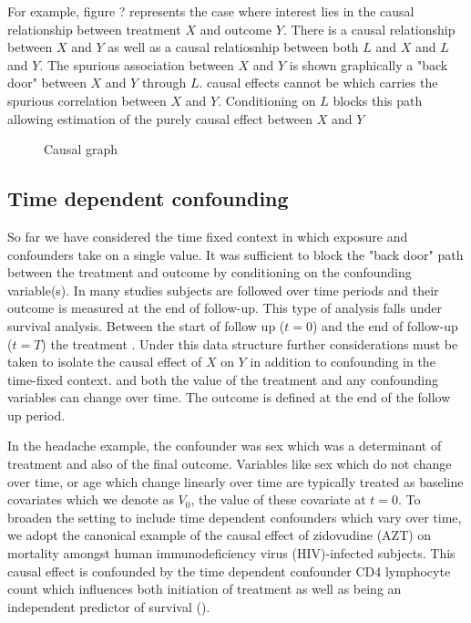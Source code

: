 \documentclass[11pt]{article}
\begin{document}
For example, figure ? represents the case where interest lies in the
causal relationship between treatment \(X\) and outcome \(Y\). There is
a causal relationship between \(X\) and \(Y\) as well as a causal
relatiosnhip between both \(L\) and \(X\) and \(L\) and \(Y\). The
spurious association between \(X\) and \(Y\) is shown graphically a
"back door" between \(X\) and \(Y\) through \(L\). causal effects cannot
be which carries the spurious correlation between \(X\) and \(Y\).
Conditioning on \(L\) blocks this path allowing estimation of the purely
causal effect between \(X\) and \(Y\)

    \begin{figure}
\caption{Causal graph}
\end{figure}

    \subsection{Time dependent
confounding}\label{time-dependent-confounding}

So far we have considered the time fixed context in which exposure and
confounders take on a single value. It was sufficient to block the "back
door" path between the treatment and outcome by conditioning on the
confounding variable(s). In many studies subjects are followed over time
periods and their outcome is measured at the end of follow-up. This type
of analysis falls under survival analysis. Between the start of follow
up (\(t = 0\)) and the end of follow-up (\(t = T\)) the treatment .
Under this data structure further considerations must be taken to
isolate the causal effect of \(X\) on \(Y\) in addition to confounding
in the time-fixed context. and both the value of the treatment and any
confounding variables can change over time. The outcome is defined at
the end of the follow up period. \linebreak

In the headache example, the confounder was sex which was a determinant
of treatment and also of the final outcome. Variables like sex which do
not change over time, or age which change linearly over time are
typically treated as baseline covariates which we denote as \(V_{0}\),
the value of these covariate at \(t=0\). To broaden the setting to
include time dependent confounders which vary over time, we adopt the
canonical example of the causal effect of zidovudine (AZT) on mortality
amongst human immunodeficiency virus (HIV)-infected subjects. This
causal effect is confounded by the time dependent confounder CD4
lymphocyte count which influences both initiation of treatment as well
as being an independent predictor of survival (\citet{Hernan2000}).
\linebreak
\end{document}
